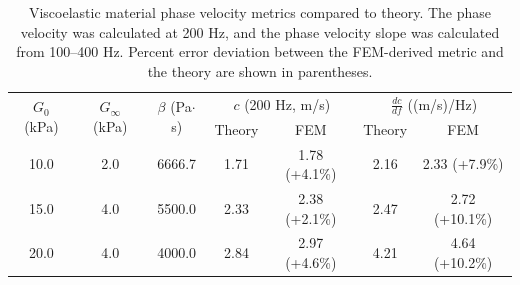 \begin{table}[htb!]
    \centering
    \caption{Viscoelastic material phase velocity metrics compared to theory.
        The phase velocity was calculated at 200 Hz, and the phase velocity
        slope was calculated from 100--400 Hz.  Percent error deviation between
        the FEM-derived metric and the theory are shown in parentheses.}
    \begin{tabular}{|c|c|c|c|c|c|c|}
    \hline
    \multirow{2}{*}{$G_0$ (kPa)} & \multirow{2}{*}{$G_\infty$ (kPa)} & \multirow{2}{*}{$\beta$ (Pa$\cdot$s)} & \multicolumn{2}{c|}{$c$ (200 Hz, m/s)} & \multicolumn{2}{c|}{$\frac{dc}{df}$ ((m/s)/Hz)} \\ \cline{4-7}
            & & & Theory & FEM & Theory & FEM \\ 
            \hline
            10.0 & 2.0 & 6666.7 & 1.71 & 1.78 (+4.1\%) & 2.16 & 2.33 (+7.9\%) \\ \hline
            15.0 & 4.0 & 5500.0 & 2.33 & 2.38 (+2.1\%) & 2.47 & 2.72 (+10.1\%) \\ \hline
            20.0 & 4.0 & 4000.0 & 2.84 & 2.97 (+4.6\%) & 4.21 & 4.64 (+10.2\%) \\
    \hline
    \end{tabular}
\label{table:elastic}
\end{table}
